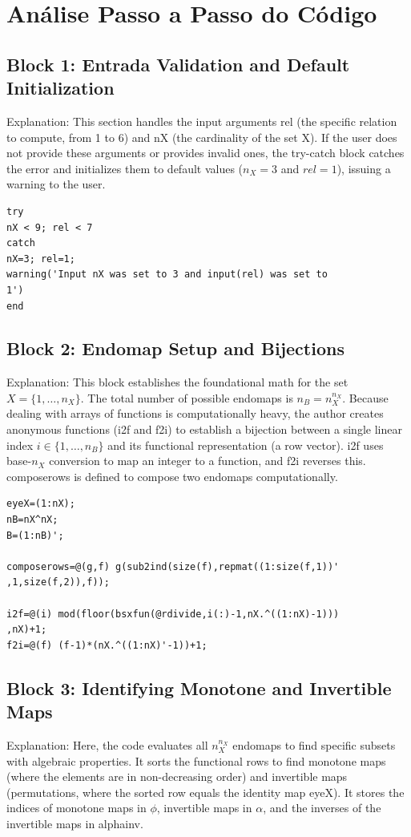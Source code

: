 \section*{Análise Passo a Passo do Código}

\subsection*{ \hspace*{0.2cm} Block 1: Entrada Validation and Default Initialization}
Explanation: This section handles the input arguments rel (the specific relation to compute, from 1 to 6) and nX (the cardinality of the set X). If the user does not provide these arguments or provides invalid ones, the try-catch block catches the error and initializes them to default values ($n_X = 3$ and $rel = 1$), issuing a warning to the user.

\begin{lstlisting}
try
nX < 9; rel < 7
catch
nX=3; rel=1; 
warning('Input nX was set to 3 and input(rel) was set to
1')
end
\end{lstlisting}


\subsection*{ \hspace*{0.2cm} Block 2: Endomap Setup and Bijections}
Explanation: This block establishes the foundational math for the set $X = \{1, \dots, n_X\}$. The total number of possible endomaps is $n_B = n_X^{n_X}$. Because dealing with arrays of functions is computationally heavy, the author creates anonymous functions (i2f and f2i) to establish a bijection between a single linear index $i \in \{1, \dots, n_B\}$ and its functional representation (a row vector). i2f uses base-$n_X$ conversion to map an integer to a function, and f2i reverses this. composerows is defined to compose two endomaps computationally.

\begin{lstlisting}
eyeX=(1:nX);  
nB=nX^nX;
B=(1:nB)';  

composerows=@(g,f) g(sub2ind(size(f),repmat((1:size(f,1))'
,1,size(f,2)),f));

i2f=@(i) mod(floor(bsxfun(@rdivide,i(:)-1,nX.^((1:nX)-1)))
,nX)+1; 
f2i=@(f) (f-1)*(nX.^((1:nX)'-1))+1;
\end{lstlisting}

\subsection*{ \hspace*{0.2cm} Block 3: Identifying Monotone and Invertible Maps}
 Explanation: Here, the code evaluates all $n_X^{n_X}$ endomaps to find specific subsets with algebraic properties. It sorts the functional rows to find monotone maps (where the elements are in non-decreasing order) and invertible maps (permutations, where the sorted row equals the identity map eyeX). It stores the indices of monotone maps in $\phi$, invertible maps in $\alpha$, and the inverses of the invertible maps in alphainv.
 
